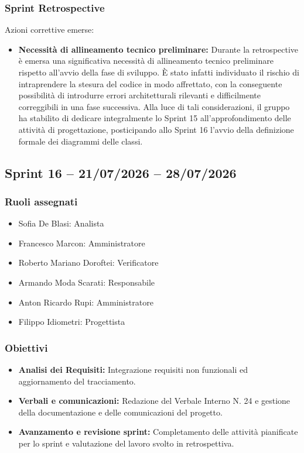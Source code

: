 \subsubsection{Sprint Retrospective}
Azioni correttive emerse:
\begin{itemize}
    \item \textbf{Necessità di allineamento tecnico preliminare:} Durante la retrospective è emersa una significativa necessità di allineamento tecnico preliminare rispetto all’avvio della fase di sviluppo. È stato infatti individuato il rischio di intraprendere la stesura del codice in modo affrettato, con la conseguente possibilità di introdurre errori architetturali rilevanti e difficilmente correggibili in una fase successiva. Alla luce di tali considerazioni, il gruppo ha stabilito di dedicare integralmente lo Sprint 15 all’approfondimento delle attività di progettazione, posticipando allo Sprint 16 l’avvio della definizione formale dei diagrammi delle classi.
\end{itemize}

\subsection{Sprint 16 -- 21/07/2026 -- 28/07/2026}
\label{sec:sprint15}

\subsubsection{Ruoli assegnati}
\begin{itemize}
    \item Sofia De Blasi: Analista
    \item Francesco Marcon: Amministratore
    \item Roberto Mariano Doroftei: Verificatore
    \item Armando Moda Scarati: Responsabile
    \item Anton Ricardo Rupi: Amministratore
    \item Filippo Idiometri: Progettista
\end{itemize}

\subsubsection{Obiettivi}
\begin{itemize}
    \item \textbf{Analisi dei Requisiti:} Integrazione requisiti non funzionali ed aggiornamento del tracciamento.
    \item \textbf{Verbali e comunicazioni:} Redazione del Verbale Interno N. 24 e gestione della documentazione e delle comunicazioni del progetto.
    \item \textbf{Avanzamento e revisione sprint:} Completamento delle attività pianificate per lo sprint e valutazione del lavoro svolto in retrospettiva.
\end{itemize}

